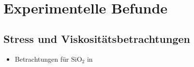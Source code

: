 \documentclass[a4paper, 10pt, 
               numbers=noenddot, toc=graduated,
               headsepline=true, footsepline=true,
               twoside=false, titlepage=true, 
               bibliography=totoc]{scrartcl}
\begin{document}
\section{Experimentelle Befunde}

\subsection{Stress und Viskositätsbetrachtungen}
	\begin{itemize}
		\item Betrachtungen für $\mathrm{SiO_2}$ in \cite{Snoeks2000}
	\end{itemize}





\end{document}
